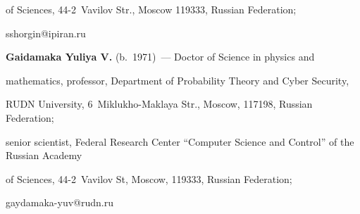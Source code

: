 of Sciences, 44-2~Vavilov Str., Moscow 119333, Russian Federation; 


\mbox{sshorgin@ipiran.ru}





\vspace*{3pt}





\noindent


\textbf{Gaidamaka Yuliya V.} (b.\ 1971)~--- Doctor of Science in physics and 


mathematics, professor, Department of Probability Theory and Cyber Security, 


RUDN University, 6~Miklukho-Maklaya Str., Moscow, 117198, Russian Federation; 


senior scientist, Federal Research Center ``Computer Science and Control'' of the Russian Academy 


of Sciences, 44-2~Vavilov St, Moscow, 119333, Russian Federation; 


\mbox{gaydamaka-yuv@rudn.ru}








\label{end\stat}





\renewcommand{\bibname}{\protect\rm Литература} 


